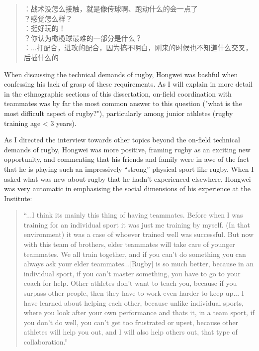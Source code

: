 \begin{CJK}{UTF8}{gbsn}
  \begin{quotation}
    ：战术没怎么接触，就是像传球啊、跑动什么的会一点了 \\
    ？感觉怎么样？\\
    ：挺好玩的！\\
    ？你认为橄榄球最难的一部分是什么？ \\
    ：...打配合，进攻的配合，因为搞不明白，刚来的时候也不知道什么交叉，后插什么的 \\
  \end{quotation}
\end{CJK}

When discussing the technical demands of rugby, Hongwei was bashful when confessing his lack of grasp of these requirements. As I will explain in more detail in the ethnographic sections of this dissertation, on-field coordination with teammates was by far the most common answer to this question ("what is the most difficult aspect of rugby?"), particularly among junior athletes (rugby training age < 3 years).

As I directed the interview towards other topics beyond the on-field technical demands of rugby, Hongwei was more positive, framing rugby as an exciting new opportunity, and commenting that his friends and family were in awe of the fact that he is playing such an impressively ``strong'' physical sport like rugby. When I asked what was new about rugby that he hadn't experienced elsewhere, Hongwei was very automatic in emphasising the social dimensions of his experience at the Institute:

\begin{quotation}
  ``...I think its mainly this thing of having teammates. Before when I was training for an individual sport it was just me training by myself. (In that environment) it was a case of whoever trained well was successful.  But now with this team of brothers, elder teammates will take care of younger teammates. We all train together, and if you can’t do something you can always ask your elder teammates...[Rugby] is so much better, because in an individual sport, if you can’t master something, you have to go to your coach for help. Other athletes don’t want to teach you, because if you surpass other people, then they have to work even harder to keep up... I have learned about helping each other, because unlike individual sports, where you look after your own performance and thats it, in a team sport, if you don’t do well, you can’t get too frustrated or upset, because other athletes will help you out, and I will also help others out, that type of collaboration.''
\end{quotation}

